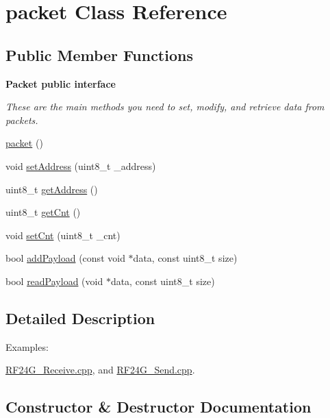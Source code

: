 \hypertarget{classpacket}{}\section{packet Class Reference}
\label{classpacket}
\subsection*{Public Member Functions}
\begin{Indent}{\bf Packet public interface}\par
{\em These are the main methods you need to set, modify, and retrieve data from packets. }\begin{DoxyCompactItemize}
\item 
\hyperlink{classpacket_ae33ebc35602983d12aa139f050f77938}{packet} ()
\item 
void \hyperlink{classpacket_adc07da444b32a9105a211862e5b7f6c3}{set\+Address} (uint8\+\_\+t \+\_\+address)
\item 
uint8\+\_\+t \hyperlink{classpacket_a87b76aa12540156e0497fa5b094e2470}{get\+Address} ()
\item 
uint8\+\_\+t \hyperlink{classpacket_a232661ed34d4278ab9bc81593a1aac64}{get\+Cnt} ()
\item 
void \hyperlink{classpacket_a583358f8d3e3361ba62af95ecd0308c2}{set\+Cnt} (uint8\+\_\+t \+\_\+cnt)
\item 
bool \hyperlink{classpacket_af40fdcda00a1371c60e9e4444df0c13f}{add\+Payload} (const void $\ast$data, const uint8\+\_\+t size)
\item 
bool \hyperlink{classpacket_a6d50c91a97477e0de8ff0d3a23341f73}{read\+Payload} (void $\ast$data, const uint8\+\_\+t size)
\end{DoxyCompactItemize}
\end{Indent}


\subsection{Detailed Description}
\begin{Desc}
\item[Examples\+: ]\par
\hyperlink{_r_f24_g__receive_8cpp-example}{R\+F24\+G\+\_\+\+Receive.\+cpp}, and \hyperlink{_r_f24_g__send_8cpp-example}{R\+F24\+G\+\_\+\+Send.\+cpp}.\end{Desc}


\subsection{Constructor \& Destructor Documentation}
\hypertarget{classpacket_ae33ebc35602983d12aa139f050f77938}{}\label{classpacket_ae33ebc35602983d12aa139f050f77938} 
